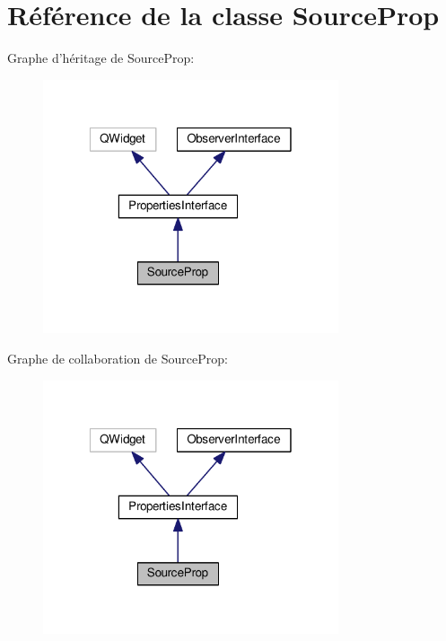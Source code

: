 \hypertarget{classSourceProp}{\section{Référence de la classe Source\+Prop}
\label{classSourceProp}
}


Graphe d'héritage de Source\+Prop\+:
\nopagebreak
\begin{figure}[H]
\begin{center}
\leavevmode
\includegraphics[width=247pt]{d6/da2/classSourceProp__inherit__graph}
\end{center}
\end{figure}


Graphe de collaboration de Source\+Prop\+:
\nopagebreak
\begin{figure}[H]
\begin{center}
\leavevmode
\includegraphics[width=247pt]{d0/d35/classSourceProp__coll__graph}
\end{center}
\end{figure}
